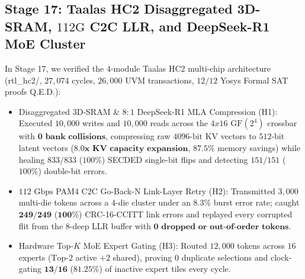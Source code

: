 \documentclass[10pt,journal,compsoc]{IEEEtran}
\def\texttt#1{#1}%
\def\textbf#1{#1}%
\def\times{x}%
\begin{document}
\subsection{Stage 17: Taalas HC2 Disaggregated 3D-SRAM, $112\text{G}$ C2C LLR, and DeepSeek-R1 MoE Cluster}
In Stage 17, we verified the $4$-module Taalas HC2 multi-chip architecture (\texttt{rtl\_hc2/}, $27,074$ cycles, $26,000$ UVM transactions, $12/12$ Yosys Formal SAT proofs \texttt{Q.E.D.}):
\begin{itemize}
    \item \textbf{Disaggregated 3D-SRAM \& $8:1$ DeepSeek-R1 MLA Compression (\texttt{H1})}: Executed $10,000$ writes and $10,000$ reads across the $4\times 16$ $\text{GF}(2^4)$ crossbar with $\mathbf{0\text{ bank collisions}}$, compressing raw $4096\text{-bit}$ KV vectors to $512\text{-bit}$ latent vectors ($\mathbf{8.0\times\text{ KV capacity expansion}}$, $87.5\%$ memory savings) while healing $833/833$ ($100\%$) SECDED single-bit flips and detecting $151/151$ ($100\%$) double-bit errors.
    \item \textbf{$112\text{ Gbps}$ PAM4 C2C Go-Back-N Link-Layer Retry (\texttt{H2})}: Transmitted $3,000$ multi-die tokens across a $4$-die cluster under an $8.3\%$ burst error rate; caught $\mathbf{249/249}$ ($\mathbf{100\%}$) \texttt{CRC-16-CCITT} link errors and replayed every corrupted flit from the $8$-deep LLR buffer with $\mathbf{0\text{ dropped or out-of-order tokens}}$.
    \item \textbf{Hardware Top-$K$ MoE Expert Gating (\texttt{H3})}: Routed $12,000$ tokens across $16$ experts ($\text{Top-}2$ active $+ 2$ shared), proving $0$ duplicate selections and clock-gating $\mathbf{13/16}$ ($\mathbf{81.25\%}$) of inactive expert tiles every cycle.
\end{itemize}
\end{document}
